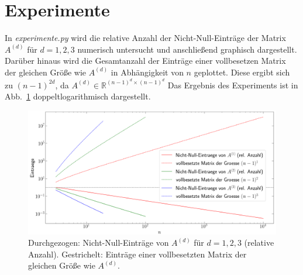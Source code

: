 \documentclass[smallheadings]{scrartcl}
\numberwithin{equation}{section}
\begin{document}
\section{Experimente}
\label{sec:experimente}
In \textit{experimente.py} wird die relative Anzahl der Nicht-Null-Einträge der Matrix $A^{(d)}$ für $d=1,2,3$ numerisch untersucht und anschließend graphisch dargestellt. Darüber hinaus wird die Gesamtanzahl der Einträge einer vollbesetzen Matrix der gleichen Größe wie $A^{(d)}$ in Abhängigkeit von $n$ geplottet. Diese ergibt sich zu $(n-1)^{2d}$, da $A^{(d)}\in\mathbb{R}^{(n-1)^d\times(n-1)^d}$ Das Ergebnis des Experiments ist in Abb.~\ref{im:nn_eintr} doppeltlogarithmisch dargestellt.

\begin{figure}[H]
\includegraphics[width=\textwidth]{Bilder/nn_eintraege}

\caption{Durchgezogen: Nicht-Null-Einträge von $A^{(d)}$ für $d=1,2,3$ (relative Anzahl). Gestrichelt: Einträge einer vollbesetzten Matrix der gleichen Größe wie $A^{(d)}$.}
\label{im:nn_eintr}
\end{figure}
\end{document}
